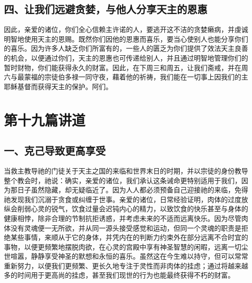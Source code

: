 
\subsection{四、让我们远避贪婪，与他人分享天主的恩惠}

因此，亲爱的诸位，你们全心信赖主许诺的人，要逃开这不洁的贪婪癞病，并虔诚明智地使用天主的恩赐。既然你们因他的恩惠而喜乐，要当心使别人也能分享你们的喜乐。因为许多人缺乏你们所富有的，一些人的匮乏为你们提供了效法天主良善的机会，以便通过你们，天主的恩惠也可传递给别人，并且通过明智地管理你们的暂时财物，你们能获得永久的财富。因此，在下周三和周五，让我们斋戒，并在周六与最蒙福的宗徒伯多禄一同守夜，藉着他的祈祷，我们能在一切事上因我们的主耶稣基督而获得天主的保护。阿们。\par



\section{第十九篇讲道}

\par


\subsection{一、克己导致更高享受}

当救主教导祂的门徒关于天主之国的来临和世界末日的时期，并以宗徒的身份教导整个教会时，祂说：确实，亲爱的诸位，我们承认这条诫命更特别适用于我们，因为那日子虽然隐藏，却无疑临近了。因为人人都必须预备自己迎接祂的来临，免得祂发现我们沉溺于贪食或纠缠于世事。亲爱的诸位，日常经验证明，肉体的过度放纵会削弱心灵的锐气，饮食过量会迟钝内心的精力，以致饮食的快乐甚至与身体的健康相悖，除非合理的节制抗拒诱惑，并考虑未来的不适而远离快乐。因为尽管肉体没有灵魂便一无所欲，并从同一源头接受感觉和运动，但同一个灵魂的职责是拒绝某些事情，来顺从于它的身体，并凭内在的判断力约束外在部分远离不合时宜的事物，以便更频繁地摆脱肉欲，在心灵的宫殿中享有神圣智慧的闲暇，远离一切尘世喧嚣，静静享受神圣的默想和永恒的喜乐。虽然这在今生难以持守，但可以常常重新努力，以便我们更频繁、更长久地专注于灵性而非肉体的挂虑；通过将越来越多的时间用于更高尚的挂虑，甚至我们现世的行为也能最终获得不朽的财富。\par

